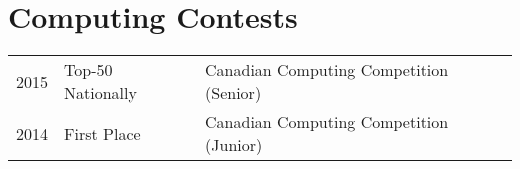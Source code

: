 \documentclass[]{deedy-resume-openfont}
\begin{document}
\begin{minipage}[t]{0.66\textwidth}

\section{Computing Contests} 
\begin{tabular}{rll}
2015	     & Top-50 Nationally  & Canadian Computing Competition (Senior)\\
2014	     & First Place  & Canadian Computing Competition (Junior)\\
\end{tabular}
\sectionsep




\end{minipage} 
\end{document}
